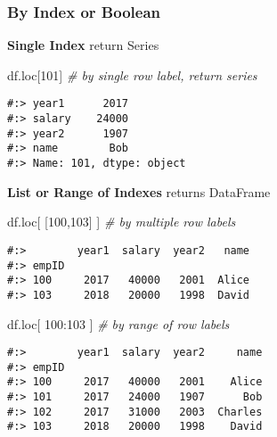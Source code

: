 \documentclass[
]{book}
\newenvironment{Shaded}{\begin{snugshade}}{\end{snugshade}}
\newcommand{\CommentTok}[1]{\textcolor[rgb]{0.37,0.37,0.37}{\textit{#1}}}
\newcommand{\DecValTok}[1]{\textcolor[rgb]{0.06,0.06,0.06}{#1}}
\newcommand{\NormalTok}[1]{#1}
\begin{document}
\hypertarget{by-index-or-boolean}{%
\subsubsection{By Index or Boolean}\label{by-index-or-boolean}}

\textbf{Single Index} return Series

\begin{Shaded}
\begin{Highlighting}[]
\NormalTok{df.loc[}\DecValTok{101}\NormalTok{]         }\CommentTok{\# by single row label, return series}
\end{Highlighting}
\end{Shaded}

\begin{verbatim}
#:> year1      2017
#:> salary    24000
#:> year2      1907
#:> name        Bob
#:> Name: 101, dtype: object
\end{verbatim}

\textbf{List or Range of Indexes} returns DataFrame

\begin{Shaded}
\begin{Highlighting}[]
\NormalTok{df.loc[ [}\DecValTok{100}\NormalTok{,}\DecValTok{103}\NormalTok{] ]  }\CommentTok{\# by multiple row labels}
\end{Highlighting}
\end{Shaded}

\begin{verbatim}
#:>        year1  salary  year2   name
#:> empID                             
#:> 100     2017   40000   2001  Alice
#:> 103     2018   20000   1998  David
\end{verbatim}

\begin{Shaded}
\begin{Highlighting}[]
\NormalTok{df.loc[  }\DecValTok{100}\NormalTok{:}\DecValTok{103}\NormalTok{  ]  }\CommentTok{\# by range of row labels}
\end{Highlighting}
\end{Shaded}

\begin{verbatim}
#:>        year1  salary  year2     name
#:> empID                               
#:> 100     2017   40000   2001    Alice
#:> 101     2017   24000   1907      Bob
#:> 102     2017   31000   2003  Charles
#:> 103     2018   20000   1998    David
\end{verbatim}
\end{document}
